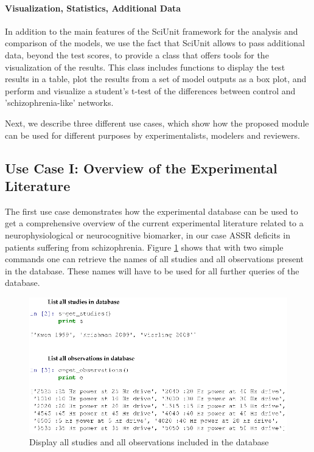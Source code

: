 \documentclass[a4paper,10pt]{article}
\begin{document}
\paragraph{Visualization, Statistics, Additional Data}

In addition to the main features of the SciUnit framework for the analysis and comparison of the models, we use the fact that SciUnit allows to pass additional data, beyond the test scores, to provide
a class that offers tools for the visualization of the results. This class includes functions to display the test results in a table, plot the results from a set of model outputs as 
a box plot, and perform and visualize a student's t-test of the differences between control and 'schizophrenia-like' networks.

Next, we describe three different use cases, which show how the proposed module can be used for different purposes by experimentalists, modelers and reviewers. 


\subsection{Use Case I: Overview of the Experimental Literature}
The first use case demonstrates how the experimental database can be used to get a comprehensive overview of the current experimental literature related to a neurophysiological or neurocognitive biomarker, in our case
ASSR deficits in patients suffering from schizophrenia. Figure \ref{Fig:ListStudies} shows that with two
simple commands one can retrieve the names of all studies and all observations present in the database. These names will have to be used for all further queries of the database.

\begin{figure}
\includegraphics[width=\textwidth]{Figures/list_studies_observations}
\caption{Display all studies  and all observations included in the database}
\label{Fig:ListStudies}
\end{figure}
\end{document}
